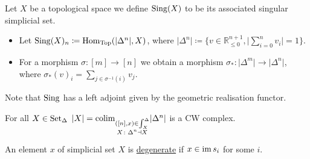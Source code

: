 \begin{exmp}
    Let $ X $ be a topological space we define $ \operatorname{Sing} ( X ) $ to be its associated singular simplicial set.
    \begin{itemize}
        \item 
         Let $\operatorname{Sing} ( X )_n \coloneqq \operatorname{Hom}_{\operatorname{Top}} ( \lvert \Delta^n \rvert , X ) $, where $ \lvert \Delta^n \rvert \coloneqq \{ v \in \mathbb{ R }_{\leq 0 }^{n+1}, \lvert \sum_{ i = 0 }^n v_i \rvert = 1 \}$.
        \item 
        For a morphism $ \sigma \colon [ m ] \to [ n ] $ we obtain a morphism $\sigma_* \colon \lvert \Delta^m \rvert \to \lvert \Delta^n \rvert $, where $ \sigma_*( v )_i= \sum_{ j \in \sigma^{-1} ( i ) } v_j$.
    \end{itemize}
    Note that $ \operatorname{Sing} $ has a left adjoint given by the geometric realisation functor.
\end{exmp}

\begin{thm}
    For all $X \in \operatorname{Set}_{\Delta}$ $\lvert X \rvert = \operatorname{colim}_{\substack{([n],x)\in \int_X^\Delta \\
    X\colon \Delta^n \dashv X} }\lvert \Delta^n\rvert$ is a CW complex.
\end{thm}

\begin{defi}
    An element $x$ of simplicial set $X$ is \underline{degenerate} if $x \in \operatorname{im} s_i$ for some $i$.
\end{defi}

